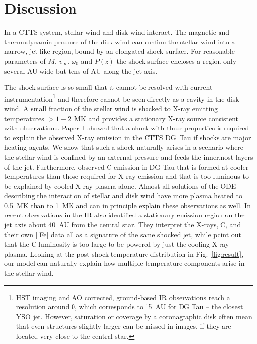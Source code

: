 \section{Discussion}
\label{sect:discussion}
In a CTTS system, stellar wind and disk wind interact. The magnetic and thermodynamic pressure of the disk wind can confine the stellar wind into a narrow, jet-like region, bound by an elongated shock surface. For reasonable parameters of $\dot M$, $v_\infty$, $\omega_0$ and $P(z)$ the shock surface encloses a region only several AU wide but tens of AU along the jet axis. 
 
The shock surface is so small that it cannot be resolved with current instrumentation\footnote{HST imaging and AO corrected, ground-based IR observations reach a resolution around 0, which corresponds to 15~AU for DG Tau -- the closest YSO jet. However, saturation or coverage by a coronagraphic disk often mean that even structures slightly larger can be missed in images, if they are located very close to the central star.} and therefore cannot be seen directly as a cavity in the disk wind. A small fraction of the stellar wind is shocked to X-ray emitting temperatures $>1-2$~MK and provides a stationary X-ray source consistent with observations. 
Paper~I showed that a shock with these properties is required to explain the observed X-ray emission in the CTTS DG~Tau if shocks are major heating agents. We show that such a shock naturally arises in a scenario where the stellar wind is confined by an external pressure and feeds the innermost layers of the jet.
Furthermore, \citet{2013A&A...550L...1S} observed C emission in DG Tau that is formed at cooler temperatures than those required for X-ray emission and that is too luminous to be explained by cooled X-ray plasma alone. Almost all solutions of the ODE describing the interaction of stellar and disk wind have more plasma heated to 0.5~MK than to 1~MK and can in principle explain these observations as well. In recent observations in the IR \citet{2014arXiv1404.0728W} also identified a stationary emission region on the jet axis about 40~AU from the central star. They interpret the X-rays,  C, and their own [ Fe] data all as a signature of the same shocked jet, while \citet{2013A&A...550L...1S} point out that the C luminosity is too large to be powered by just the cooling X-ray plasma. Looking at the post-shock temperature distribution in Fig.~\ref{fig:result}, our model can naturally explain how multiple temperature components arise in the stellar wind.

